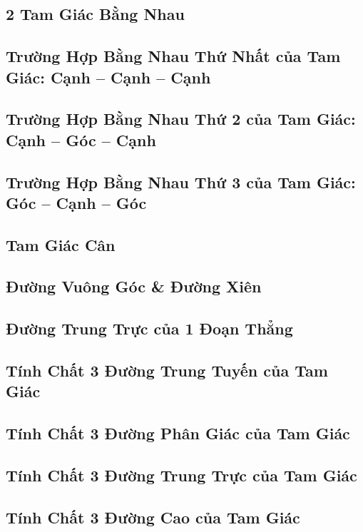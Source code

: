 \documentclass{article}
\numberwithin{equation}{section}
\begin{document}
\subsection{2 Tam Giác Bằng Nhau}

\subsection{Trường Hợp Bằng Nhau Thứ Nhất của Tam Giác: Cạnh -- Cạnh -- Cạnh}

\subsection{Trường Hợp Bằng Nhau Thứ 2 của Tam Giác: Cạnh -- Góc -- Cạnh}

\subsection{Trường Hợp Bằng Nhau Thứ 3 của Tam Giác: Góc -- Cạnh -- Góc}

\subsection{Tam Giác Cân}

\subsection{Đường Vuông Góc \& Đường Xiên}

\subsection{Đường Trung Trực của 1 Đoạn Thẳng}

\subsection{Tính Chất 3 Đường Trung Tuyến của Tam Giác}

\subsection{Tính Chất 3 Đường Phân Giác của Tam Giác}

\subsection{Tính Chất 3 Đường Trung Trực của Tam Giác}

\subsection{Tính Chất 3 Đường Cao của Tam Giác}
\end{document}
